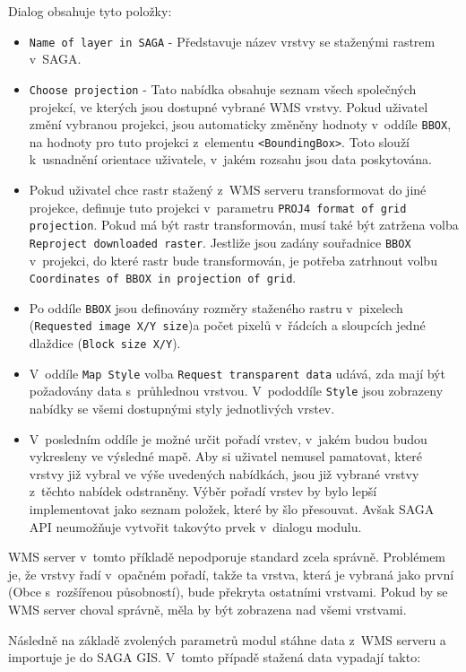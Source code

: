 \documentclass[a4paper,12pt]{article}
\begin{document}
\newpage
Dialog obsahuje tyto položky:

\begin{itemize}
\item {\tt Name of layer in SAGA} - Představuje název vrstvy se 
      staženými rastrem v~SAGA.
\item {\tt Choose projection} - Tato nabídka obsahuje seznam všech společných
  projekcí, ve kterých jsou dostupné vybrané WMS vrstvy. Pokud uživatel
  změní vybranou projekci, jsou automaticky změněny hodnoty v~oddíle
  {\tt BBOX}, na  hodnoty pro tuto projekci z~elementu {\tt <BoundingBox>}. 
  Toto slouží k~usnadnění orientace uživatele, v~jakém rozsahu 
  jsou data poskytována.
\item Pokud uživatel chce rastr stažený z~WMS serveru transformovat 
  do jiné projekce,
  definuje tuto projekci v~parametru {\tt PROJ4 format of grid projection}. 
  Pokud má  být rastr transformován, musí také být zatržena volba
  {\tt Reproject  downloaded raster}. Jestliže jsou zadány souřadnice {\tt BBOX}
  v~projekci, do které rastr bude transformován, je potřeba
  zatrhnout volbu  {\tt Coordinates of BBOX in projection of grid}.
\item Po oddíle {\tt BBOX} jsou definovány rozměry staženého rastru
v~pixelech ({\tt Requested image X/Y size})a počet pixelů v~řádcích a
  sloupcích jedné dlaždice ({\tt Block size X/Y}).
\item V~oddíle {\tt Map Style} volba {\tt Request transparent data} udává, zda
  mají být požadovány data s~průhlednou vrstvou.  V~pododdíle {\tt Style}
  jsou zobrazeny nabídky se všemi dostupnými styly jednotlivých
  vrstev.
\item V~posledním oddíle je možné určit pořadí vrstev, v~jakém budou
  budou vykresleny ve výsledné mapě. Aby si uživatel nemusel
  pamatovat, které vrstvy již vybral ve výše uvedených nabídkách, jsou
  již vybrané vrstvy z~těchto nabídek odstraněny.  Výběr pořadí vrstev
  by bylo lepší implementovat jako seznam položek, které by šlo
  přesouvat. Avšak SAGA API neumožňuje vytvořit takovýto prvek
v~dialogu modulu.
\end{itemize}


WMS server v~tomto příkladě nepodporuje standard zcela
správně. Problémem je, že vrstvy řadí v~opačném pořadí, takže ta vrstva,
která je vybraná jako první (Obce s~rozšířenou působností), bude
překryta ostatními vrstvami. Pokud by se WMS server choval správně,
měla by být zobrazena nad všemi vrstvami.


Následně na základě zvolených parametrů modul stáhne data z~WMS
serveru a importuje je do SAGA GIS. V~tomto případě stažená data
vypadají takto:
\end{document}
